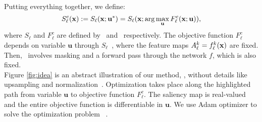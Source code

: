 
\noindent Putting everything together, we define:
\begin{equation}
	S^c_\ell(\mathbf{x}) \mathrel{:=} S_\ell(\mathbf{x}; \mathbf{u}^*) = S_\ell(\mathbf{x}; \arg\max_{\mathbf{u}} F^c_\ell(\mathbf{x};
	\mathbf{u})),
\label{eq:o-sal}
\end{equation}
where $S_\ell$ and $F^c_\ell$ are defined by~ and~ respectively. The objective  
function $F^c_\ell$ ~ depends on variable $\mathbf{u}$ through $S_\ell$~, where 
the feature maps $A^k_\ell = f^k_\ell(\mathbf{x})$ are fixed. Then,~ involves masking and a 
forward pass  through the network $f$, which is also fixed.\\

\noindent Figure \ref{fig:idea} is an abstract illustration of our method, , 
without details like upsampling and normalization~. Optimization takes place along the 
highlighted path from variable $\mathbf{u}$ to objective function $F^c_\ell$. The saliency map is 
real-valued and the entire objective function is differentiable in $\mathbf{u}$. We use Adam 
optimizer \autocite{kingma2014adam} to solve the optimization problem ~.







